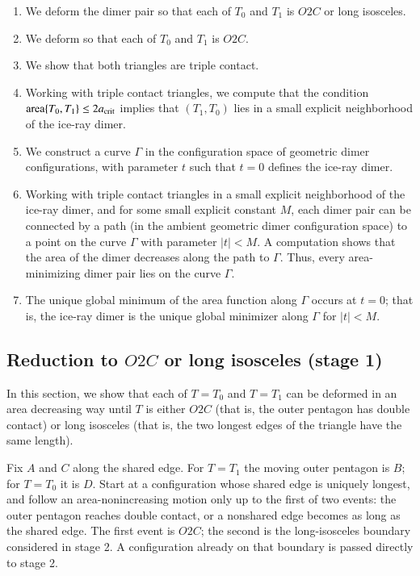 \begin{enumerate}
\item We deform the dimer pair so that each of $T_0$ and $T_1$ is
  $O2C$ or long isosceles.
\item We deform so that each of $T_0$ and $T_1$ is $O2C$.
\item We show that both triangles are triple contact.
\item Working with triple contact triangles, we compute that the
  condition ${\operatorname{area}}\{T_0,T_1\}\le 2a_\text{crit}$ implies that $(T_1,T_0)$
  lies in a small explicit neighborhood of the ice-ray dimer.
\item We construct a curve $\Gamma$ in the configuration space of
  geometric dimer configurations, with parameter $t$ such that $t=0$ defines the ice-ray
  dimer.
\item Working with triple contact triangles in a small explicit
  neighborhood of the ice-ray dimer, and for some small explicit
  constant $M$, each dimer pair can be connected by a path (in the
  ambient geometric dimer configuration space) to a point on the curve $\Gamma$ with
  parameter $|t|<M$.  A computation shows that the area of the dimer
  decreases along the path to $\Gamma$.  Thus, every area-minimizing
  dimer pair lies on the curve $\Gamma$.
\item The unique global minimum of the area function along $\Gamma$
  occurs at $t=0$; that is, the ice-ray dimer is the unique global
  minimizer along $\Gamma$ for $|t|<M$.
\end{enumerate}

\subsection{Reduction to $O2C$ or long isosceles (stage 1)}

In this section, we show that each of $T=T_0$ and $T=T_1$ can be
deformed in an area decreasing way until $T$ is either $O2C$ (that is,
the outer pentagon has double contact) or long isosceles (that is, the
two longest edges of the triangle have the same length).

Fix $A$ and $C$ along the shared edge.  For $T=T_1$ the moving
outer pentagon is $B$; for $T=T_0$ it is $D$.  Start at a
configuration whose shared edge is uniquely longest, and follow an
area-nonincreasing motion only up to the first of two events: the
outer pentagon reaches double contact, or a nonshared edge becomes
as long as the shared edge.  The first event is $O2C$; the second
is the long-isosceles boundary considered in stage 2.  A configuration
already on that boundary is passed directly to stage 2.

